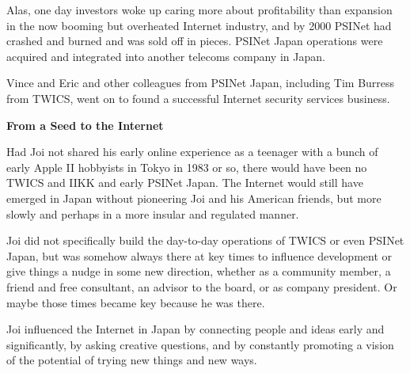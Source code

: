 Alas, one day investors woke up caring more about profitability than expansion in the now booming but overheated Internet industry, and by 2000 PSINet had crashed and burned and was sold off in pieces. PSINet Japan operations were acquired and integrated into another telecoms company in Japan.

Vince and Eric and other colleagues from PSINet Japan, including Tim Burress from TWICS, went on to found a successful Internet security services business.

\textbf{From a Seed to the Internet}

Had Joi not shared his early online experience as a teenager with a bunch of early Apple II hobbyists in Tokyo in 1983 or so, there would have been no TWICS and IIKK and early PSINet Japan. The Internet would still have emerged in Japan without pioneering Joi and his American friends, but more slowly and perhaps in a more insular and regulated manner.

Joi did not specifically build the day-to-day operations of TWICS or even PSINet Japan, but was somehow always there at key times to influence development or give things a nudge in some new direction, whether as a community member, a friend and free consultant, an advisor to the board, or as company president. Or maybe those times became key because he was there.

Joi influenced the Internet in Japan by connecting people and ideas early and significantly, by asking creative questions, and by constantly promoting a vision of the potential of trying new things and new ways.

